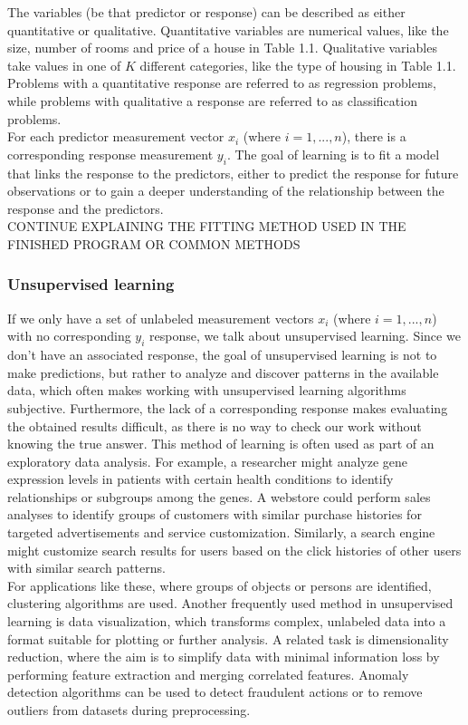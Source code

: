 \documentclass[a4paper,oneside,onecolumn,12pt]{LegrandOrangeBook}
\begin{document}
			The variables (be that predictor or response) can be described as either quantitative or qualitative. Quantitative variables are numerical values, like the size, number of rooms and price of a house in Table 1.1. Qualitative variables take values in one of $K$ different categories, like the type of housing in Table 1.1. Problems with a quantitative response are referred to as regression problems, while problems with qualitative a response are referred to as classification problems. \cite{AISL}\\
			For each predictor measurement vector $x_i$ (where $i = 1, ..., n$), there is a corresponding response measurement $y_i$. The goal of learning is to fit a model that links the response to the predictors, either to predict the response for future observations or to gain a deeper understanding of the relationship between the response and the predictors. \cite{AISL}\\
			CONTINUE EXPLAINING THE FITTING METHOD USED IN THE FINISHED PROGRAM OR COMMON METHODS\\

			\subsubsection{Unsupervised learning}
			If we only have a set of unlabeled measurement vectors $x_i$ (where $i = 1, ..., n$) with no corresponding $y_i$ response, we talk about unsupervised learning. Since we don't have an associated response, the goal of unsupervised learning is not to make predictions, but rather to analyze and discover patterns in the available data, which often makes working with unsupervised learning algorithms subjective. Furthermore, the lack of a corresponding response makes evaluating the obtained results difficult, as there is no way to check our work without knowing the true answer. This method of learning is often used as part of an exploratory data analysis. For example, a researcher might analyze gene expression levels in patients with certain health conditions to identify relationships or subgroups among the genes. A webstore could perform sales analyses to identify groups of customers with similar purchase histories for targeted advertisements and service customization. Similarly, a search engine might customize search results for users based on the click histories of other users with similar search patterns. \cite{AISL} \\
			For applications like these, where groups of objects or persons are identified, clustering algorithms are used. Another frequently used method in unsupervised learning is data visualization, which transforms complex, unlabeled data into a format suitable for plotting or further analysis. A related task is dimensionality reduction, where the aim is to simplify data with minimal information loss by performing feature extraction and merging correlated features. Anomaly detection algorithms can be used to detect fraudulent actions or to remove outliers from datasets during preprocessing. \cite{HMLSKT}
\end{document}

